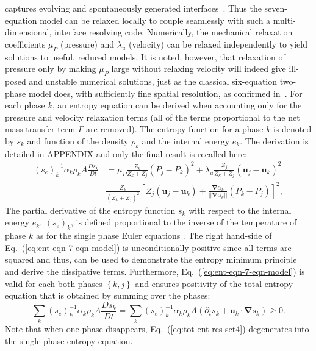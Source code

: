\documentclass[preprint,10pt]{elsarticle}
\newcommand{\grad}{\mbold{\nabla}}
\newcommand{\mbold}[1]{\boldsymbol#1}
\newcommand{\eqt}[1]{Eq.~(\ref{#1})}                     %
\begin{document}
captures evolving and spontaneously generated
interfaces~\cite{Saurel_2009}. Thus the seven-equation model
can be relaxed locally to couple seamlessly with such a
multi-dimensional, interface resolving code. Numerically, the mechanical relaxation coefficients $\mu_P$
(pressure) and $\lambda_u$ (velocity) can be relaxed independently to
yield solutions to useful, reduced models.  It
is noted, however, that relaxation of pressure only by making $\mu_P$
large without relaxing velocity will indeed give ill-posed and
unstable numerical solutions, just as the classical six-equation
two-phase model does, with sufficiently fine spatial resolution, as
confirmed in~\cite{SEM,Herrard_2005}. For each phase $k$, an entropy equation can be derived when accounting only for the pressure and velocity relaxation terms (all of the terms proportional to the net mass transfer term $\Gamma$ are removed). The entropy function for a phase $k$ is denoted by $s_k$ and function of the density $\rho_k$ and the internal energy $e_k$. The derivation is detailed in APPENDIX and only the final result is recalled here:
%
\begin{align}\label{eq:ent-eqn-7-eqn-model}
(s_{e})_k^{-1} \alpha_k \rho_k A \frac{Ds_k}{Dt} &= \mu_P \frac{Z_k}{Z_k+Z_j} (P_j - P_k)^2 + \lambda_u \frac{Z_j}{Z_k+Z_j} (\mbold u_j -\mbold  u_k)^2 \nonumber
\\
& \frac{Z_k}{\left( Z_k+Z_j \right)^2} \left[ Z_j (\mbold u_j-\mbold u_k)+\frac{\grad \alpha_k}{|| \grad \alpha_k ||}(P_k-P_j)\right]^2,
\end{align}
The partial derivative of the entropy function $s_k$ with respect to the internal energy $e_k$, $(s_e)_k$, is defined proportional to the inverse of the temperature of phase $k$ as for the single phase Euler equations \cite{jlg}. The right hand-side of \eqt{eq:ent-eqn-7-eqn-model} is unconditionally positive since all terms are squared and thus, can be used to demonstrate the entropy minimum principle and derive the dissipative terms. Furthermore, \eqt{eq:ent-eqn-7-eqn-model} is valid for each both phases $\left\{k, j\right\}$ and ensures positivity of the total entropy equation that is obtained by summing over the phases:
%
\begin{equation}\label{eq:tot-ent-res-sct4}
\sum_k (s_{e})_k^{-1} \alpha_k \rho_k A \frac{Ds_k}{Dt} = \sum_k (s_{e})_k^{-1} \alpha_k \rho_k A \left( \partial_t s_k + \mbold u_k \cdot \grad s_k \right) \geq 0 \nonumber .
\end{equation}
%
Note that when one phase disappears, \eqt{eq:tot-ent-res-sct4} degenerates into the single phase entropy equation.
\end{document}
